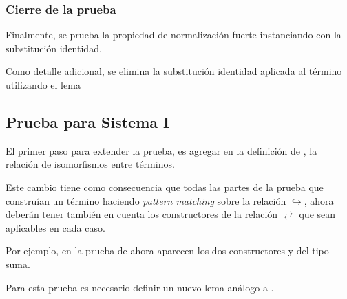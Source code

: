 

\begin{samepage}
\end{samepage}


\subsubsection{Cierre de la prueba}

Finalmente, se prueba la propiedad de normalización fuerte instanciando  con la substitución identidad.

Como detalle adicional, se elimina la substitución identidad aplicada al término utilizando el lema
\AgdaSymbol{:}
\AgdaSymbol{\}}
\AgdaSymbol{\{}
\AgdaSymbol{:}
\AgdaSymbol{\}}



\subsection{Prueba para Sistema I}

El primer paso para extender la prueba, es agregar en la definición de , la relación de isomorfismos entre términos.


Este cambio tiene como consecuencia que todas las partes de la prueba que construían un término \snstar haciendo \textit{pattern matching} sobre la relación $\hookrightarrow$, ahora deberán tener también en cuenta los constructores de la relación $\rightleftarrows$ que sean aplicables en cada caso.

Por ejemplo, en la prueba de  ahora aparecen los dos constructores  y  del tipo suma.


Para esta prueba es necesario definir un nuevo lema análogo a .

